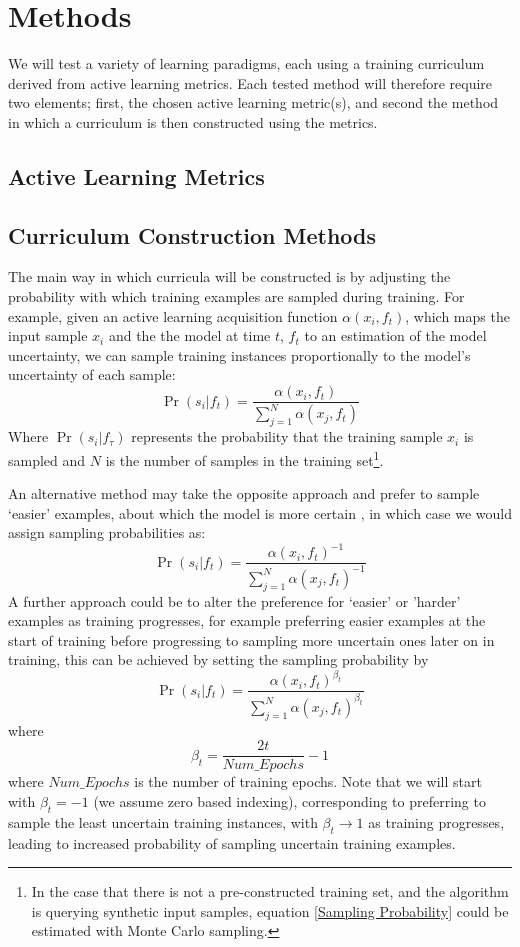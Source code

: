 \documentclass[a4paper,10.5pt]{article}
\begin{document}
\section{Methods}
We will test a variety of learning paradigms, each using a training curriculum derived from active learning metrics. Each tested method will therefore require two elements; first, the chosen active learning metric(s), and second the method in which a curriculum is then constructed using the metrics. 
\subsection*{Active Learning Metrics}


\subsection*{Curriculum Construction Methods}
The main way in which curricula will be constructed is by adjusting the probability with which training examples are sampled during training. For example, given an active learning acquisition function $\alpha(x_i,f_t)$, which maps the input sample $x_i$ and the the model at time $t$, $f_t$ to an estimation of the model uncertainty, we can sample training instances proportionally to the model's uncertainty of each sample:
\begin{equation}\label{Sampling Probability}
\Pr(s_i|f_t) = \frac{\alpha(x_i,f_t)}{\sum_{j=1}^{N}\alpha(x_j,f_t)}
\end{equation}
Where $\Pr(s_i|f_\tau)$ represents the probability that the training sample $x_i$ is sampled and $N$ is the number of samples in the training set\footnote{In the case that there is not a pre-constructed training set, and the algorithm is querying synthetic input samples, equation \ref{Sampling Probability} could be estimated with Monte Carlo sampling.}. 

An alternative method may take the opposite approach and prefer to sample `easier' examples, about which the model is more certain , in which case we would assign sampling probabilities as:
\begin{equation}
\Pr(s_i|f_t) = \frac{\alpha(x_i,f_t)^{-1}}{\sum_{j=1}^{N}\alpha(x_j,f_t)^{-1}}
\end{equation}
A further approach could be to alter the preference for `easier' or 'harder' examples as training progresses, for example preferring easier examples at the start of training before progressing to sampling more uncertain ones later on in training, this can be achieved by setting the sampling probability by
\begin{equation}
\Pr(s_i|f_t) = \frac{\alpha(x_i,f_t)^{\beta_t}}{\sum_{j=1}^{N}\alpha(x_j,f_t)^{\beta_t}}
\end{equation}
where
\begin{equation}
\beta_t = \frac{2t}{Num\_Epochs} - 1
\end{equation}
where $Num\_Epochs$ is the number of training epochs. Note that we will start with $\beta_t = -1$ (we assume zero based indexing), corresponding to preferring to sample the least uncertain training instances, with $\beta_t \rightarrow 1$ as training progresses, leading to increased probability of sampling uncertain training examples. 
\end{document}
